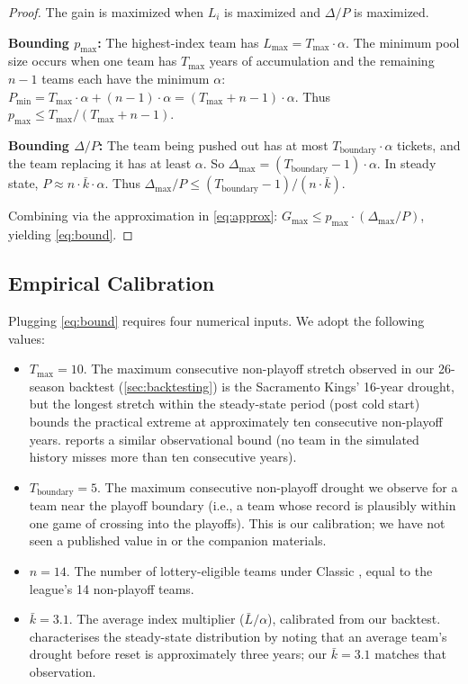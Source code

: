 \begin{proof}
The gain is maximized when $L_i$ is maximized and $\Delta / P$ is maximized.

\textbf{Bounding $p_{\max}$:} The highest-index team has $L_{\max} = T_{\max} \cdot \alpha$. The minimum pool size occurs when one team has $T_{\max}$ years of accumulation and the remaining $n-1$ teams each have the minimum $\alpha$: $P_{\min} = T_{\max} \cdot \alpha + (n-1) \cdot \alpha = (T_{\max} + n - 1) \cdot \alpha$. Thus $p_{\max} \leq T_{\max} / (T_{\max} + n - 1)$.

\textbf{Bounding $\Delta / P$:} The team being pushed out has at most $T_{\text{boundary}} \cdot \alpha$ tickets, and the team replacing it has at least $\alpha$. So $\Delta_{\max} = (T_{\text{boundary}} - 1) \cdot \alpha$. In steady state, $P \approx n \cdot \bar{k} \cdot \alpha$. Thus $\Delta_{\max} / P \leq (T_{\text{boundary}} - 1) / (n \cdot \bar{k})$.

Combining via the approximation in \cref{eq:approx}: $G_{\max} \leq p_{\max} \cdot (\Delta_{\max}/P)$, yielding \cref{eq:bound}.
\end{proof}

\subsection{Empirical Calibration}
\label{sec:calibration}

Plugging \cref{eq:bound} requires four numerical inputs. We adopt the following values:

\begin{itemize}
    \item $T_{\max} = 10$. The maximum consecutive non-playoff stretch observed in our 26-season backtest (\cref{sec:backtesting}) is the Sacramento Kings' 16-year drought, but the longest stretch within the steady-state period (post cold start) bounds the practical extreme at approximately ten consecutive non-playoff years. \citet{highley2026cola} reports a similar observational bound (no team in the simulated history misses more than ten consecutive years).
    \item $T_{\text{boundary}} = 5$. The maximum consecutive non-playoff drought we observe for a team near the playoff boundary (i.e., a team whose record is plausibly within one game of crossing into the playoffs). This is our calibration; we have not seen a published value in \citet{highley2026cola} or the companion materials.
    \item $n = 14$. The number of lottery-eligible teams under Classic \cola{}, equal to the league's 14 non-playoff teams.
    \item $\bar{k} = 3.1$. The average index multiplier ($\bar{L} / \alpha$), calibrated from our backtest. \citet{highley2026cola} characterises the steady-state distribution by noting that an average team's drought before reset is approximately three years; our $\bar{k} = 3.1$ matches that observation.
\end{itemize}

